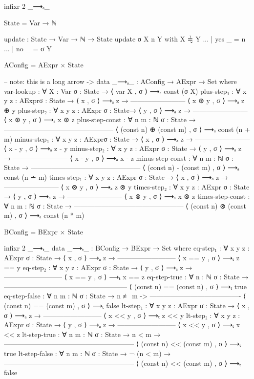 \documentclass{lecturenotes}
\begin{document}
\begin{code}[hide]
infixr 2 _⟶ₐ_

State = Var → ℕ

update : State → Var → ℕ → State
update σ X n Y with X ≟̬ Y
... | yes _ = n
... | no _ = σ Y 

AConfig = AExpr × State

-- note: this is a long arrow \-->
data _⟶ₐ_ : AConfig → AExpr → Set where
  var-lookup : ∀ {X : Var} {σ : State} →
    ⟨ var X , σ ⟩ ⟶ₐ const (σ X)
  plus-step₁ : ∀ {x y z : AExpr}{σ : State} →
         ⟨ x , σ ⟩ ⟶ₐ z →
    ------------------------
     ⟨ x ⊕ y , σ ⟩ ⟶ₐ z ⊕ y
  plus-step₂ : ∀ {x y z : AExpr} {σ : State}→
         ⟨ y , σ ⟩ ⟶ₐ z →
    ------------------------
     ⟨ x ⊕ y , σ ⟩ ⟶ₐ x ⊕ z
  plus-step-const : ∀ {n m : ℕ} {σ : State} →
    ------------------------------------------------
     ⟨ (const n) ⊕ (const m) , σ ⟩ ⟶ₐ const (n + m)
  minus-step₁ : ∀ {x y z : AExpr}{σ : State} →
         ⟨ x , σ ⟩ ⟶ₐ z →
    ------------------------
     ⟨ x - y , σ ⟩ ⟶ₐ z - y
  minus-step₂ : ∀ {x y z : AExpr} {σ : State} →
         ⟨ y , σ ⟩ ⟶ₐ z →
    ------------------------
     ⟨ x - y , σ ⟩ ⟶ₐ x - z
  minus-step-const : ∀ {n m : ℕ} {σ : State} →
    ------------------------------------------------
     ⟨ (const n) - (const m) , σ ⟩ ⟶ₐ const (n ∸ m) 
  times-step₁ : ∀ {x y z : AExpr} {σ : State} →
         ⟨ x , σ ⟩ ⟶ₐ z →
    ------------------------
     ⟨ x ⊗ y , σ ⟩ ⟶ₐ z ⊗ y
  times-step₂ : ∀ {x y z : AExpr} {σ : State} →
         ⟨ y , σ ⟩ ⟶ₐ z →
    ------------------------
     ⟨ x ⊗ y , σ ⟩ ⟶ₐ x ⊗ z
  times-step-const : ∀ {n m : ℕ} {σ : State} →
    ------------------------------------------------
     ⟨ (const n) ⊗ (const m) , σ ⟩ ⟶ₐ const (n * m)

BConfig = BExpr × State

infixr 2 _⟶ₜ_
data _⟶ₜ_ : BConfig → BExpr → Set where
  eq-step₁ : ∀ {x y z : AExpr} {σ : State} →
          ⟨ x , σ ⟩ ⟶ₐ z → 
    --------------------------
     ⟨ x == y , σ ⟩ ⟶ₜ z == y
  eq-step₂ : ∀ {x y z : AExpr} {σ : State} →
          ⟨ y , σ ⟩ ⟶ₐ z →
    --------------------------
     ⟨ x == y , σ ⟩ ⟶ₜ x == z
  eq-step-true : ∀ {n : ℕ} {σ : State} →
    ------------------------------------------------------
     ⟨ (const n) == (const n) , σ ⟩ ⟶ₜ true
  eq-step-false : ∀ {n m : ℕ} {σ : State} →
                    n ≢ m ->
    ----------------------------------------
    ⟨ (const n) == (const m) , σ ⟩ ⟶ₜ false
  lt-step₁ : ∀ {x y z : AExpr} {σ : State} →
          ⟨ x , σ ⟩ ⟶ₐ z →
    --------------------------
     ⟨ x << y , σ ⟩ ⟶ₜ z << y 
  lt-step₂ : ∀ {x y z : AExpr} {σ : State} →
          ⟨ y , σ ⟩ ⟶ₐ z →
    --------------------------
     ⟨ x << y , σ ⟩ ⟶ₜ x << z
  lt-step-true : ∀ {n m : ℕ} {σ : State} →
                                  n < m →
    ---------------------------------------------------------
     ⟨ (const n) << (const m) , σ ⟩ ⟶ₜ true
  lt-step-false : ∀ {n m : ℕ} {σ : State} →
                                 ¬ (n < m) → 
    ---------------------------------------------------------
     ⟨ (const n) << (const m) , σ ⟩ ⟶ₜ false


\end{code}
\end{document}
